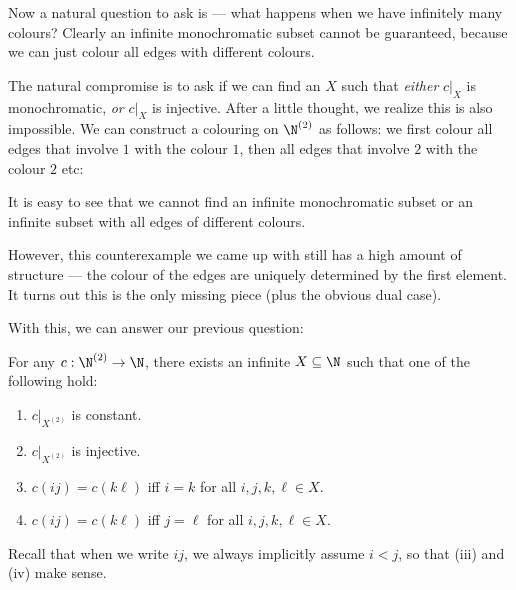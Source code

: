 \documentclass[a4paper]{article}
\begin{document}
Now a natural question to ask is --- what happens when we have infinitely many colours? Clearly an infinite monochromatic subset cannot be guaranteed, because we can just colour all edges with different colours.

The natural compromise is to ask if we can find an $X$ such that \emph{either} $c|_{X}$ is monochromatic, \emph{or} $c|_{X}$ is injective. After a little thought, we realize this is also impossible. We can construct a colouring on $\N^{(2)}$ as follows: we first colour all edges that involve $1$ with the colour $1$, then all edges that involve $2$ with the colour $2$ etc:
\begin{center}
\end{center}
It is easy to see that we cannot find an infinite monochromatic subset or an infinite subset with all edges of different colours.

However, this counterexample we came up with still has a high amount of structure --- the colour of the edges are uniquely determined by the first element. It turns out this is the only missing piece (plus the obvious dual case).

With this, we can answer our previous question:
\begin{thm}
  For any $c: \N^{(2)} \to \N$, there exists an infinite $X \subseteq \N$ such that one of the following hold:
  \begin{enumerate}
    \item $c|_{X^{(2)}}$ is constant.
    \item $c|_{X^{(2)}}$ is injective.
    \item $c(ij) = c(k\ell)$ iff $i = k$ for all $i, j, k, \ell \in X$.
    \item $c(ij) = c(k\ell)$ iff $j = \ell$ for all $i, j, k, \ell \in X$.
  \end{enumerate}
\end{thm}
Recall that when we write $ij$, we always implicitly assume $i < j$, so that (iii) and (iv) make sense.
\end{document}
